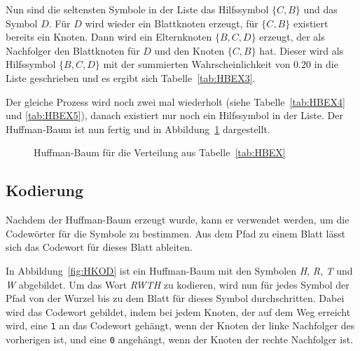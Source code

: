 \documentclass[twoside,11pt,a4paper]{article}
\theoremstyle{break}
\begin{document}
Nun sind die seltensten Symbole in der Liste das Hilfssymbol $\{C,
B\}$ und das Symbol $D$. Für $D$ wird wieder ein Blattknoten erzeugt,
für $\{C, B\}$ existiert bereits ein Knoten. Dann wird ein
Elternknoten $\{B, C, D\}$ erzeugt, der als Nachfolger den Blattknoten
für $D$ und den Knoten $\{C, B\}$ hat. Dieser wird als Hilfssymbol
$\{B, C, D\}$ mit der summierten Wahrscheinlichkeit von $0.20$ in die
Liste geschrieben und es ergibt sich Tabelle~\ref{tab:HBEX3}.

Der gleiche Prozess wird noch zwei mal wiederholt (siehe
Tabelle~\ref{tab:HBEX4} und \ref{tab:HBEX5}), danach existiert nur
noch ein Hilfssymbol in der Liste. Der Huffman-Baum ist nun fertig
und in Abbildung~\ref{fig:HBEX} dargestellt.

\begin{figure}[h]
\centering
{}
\caption{Huffman-Baum für die Verteilung aus Tabelle~\ref{tab:HBEX}} \label{fig:HBEX}
\end{figure}


\subsection{Kodierung}
Nachdem der Huffman-Baum erzeugt wurde, kann er verwendet werden, um
die Codewörter für die Symbole zu bestimmen. Aus dem Pfad zu einem
Blatt lässt sich das Codewort für dieses Blatt ableiten.

In Abbildung~\ref{fig:HKOD} ist ein Huffman-Baum mit den Symbolen
\emph{H}, \emph{R}, \emph{T} und \emph{W} abgebildet. Um das Wort
\emph{RWTH} zu kodieren, wird nun für jedes Symbol der Pfad von der
Wurzel bis zu dem Blatt für dieses Symbol durchschritten. Dabei wird das
Codewort gebildet, indem bei jedem Knoten, der auf dem Weg erreicht
wird, eine {\tt1} an das Codewort gehängt, wenn der Knoten der linke
Nachfolger des vorherigen ist, und eine {\tt0} angehängt, wenn der
Knoten der rechte Nachfolger ist.
\end{document}
